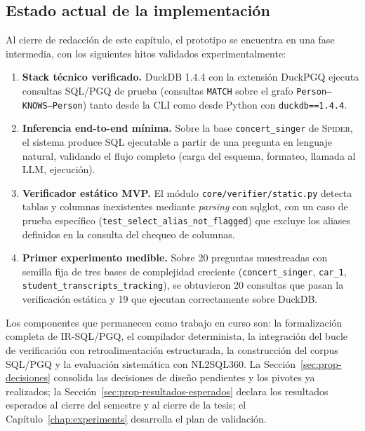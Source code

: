 \subsection{Estado actual de la implementación}
\label{subsec:prop-estado}

Al cierre de redacción de este capítulo, el prototipo se encuentra en una fase intermedia, con los siguientes hitos validados experimentalmente:

\begin{enumerate}
    \item \textbf{Stack técnico verificado.} DuckDB 1.4.4 con la extensión DuckPGQ ejecuta consultas \ac{SQL}/\ac{PGQ} de prueba (consultas \texttt{MATCH} sobre el grafo \texttt{Person--KNOWS--Person}) tanto desde la CLI como desde Python con \texttt{duckdb==1.4.4}.
    \item \textbf{Inferencia end-to-end mínima.} Sobre la base \texttt{concert\_singer} de \textsc{Spider}, el sistema produce SQL ejecutable a partir de una pregunta en lenguaje natural, validando el flujo completo (carga del esquema, formateo, llamada al \ac{LLM}, ejecución).
    \item \textbf{Verificador estático MVP.} El módulo \texttt{core/verifier/static.py} detecta tablas y columnas inexistentes mediante \emph{parsing} con sqlglot, con un caso de prueba específico (\texttt{test\_select\_alias\_not\_flagged}) que excluye los aliases definidos en la consulta del chequeo de columnas.
    \item \textbf{Primer experimento medible.} Sobre 20 preguntas muestreadas con semilla fija de tres bases de complejidad creciente (\texttt{concert\_singer}, \texttt{car\_1}, \texttt{student\_transcripts\_tracking}), se obtuvieron 20 consultas que pasan la verificación estática y 19 que ejecutan correctamente sobre DuckDB.
\end{enumerate}

Los componentes que permanecen como trabajo en curso son: la formalización completa de IR-SQL/PGQ, el compilador determinista, la integración del bucle de verificación con retroalimentación estructurada, la construcción del corpus \ac{SQL}/\ac{PGQ} y la evaluación sistemática con \textsc{NL2SQL360}. La Sección~\ref{sec:prop-decisiones} consolida las decisiones de diseño pendientes y los pivotes ya realizados; la Sección~\ref{sec:prop-resultados-esperados} declara los resultados esperados al cierre del semestre y al cierre de la tesis; el Capítulo~\ref{chap:experiments} desarrolla el plan de validación.

